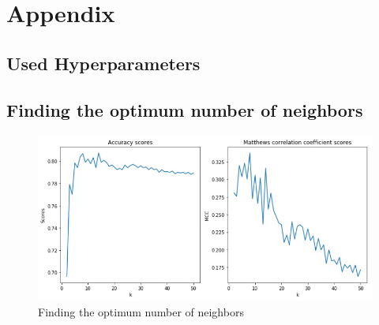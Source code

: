 \section{Appendix}

\subsection{Used Hyperparameters}
\label{ssec:ushp}


\subsection{Finding the optimum number of neighbors}
\label{ssec:fonn}
\begin{figure}[h]
    \centering
    \includegraphics[width=.7\linewidth]{ThesisTemplate/Images/KNN_n_neighbors.png}
    \caption{Finding the optimum number of neighbors}
\end{figure}
